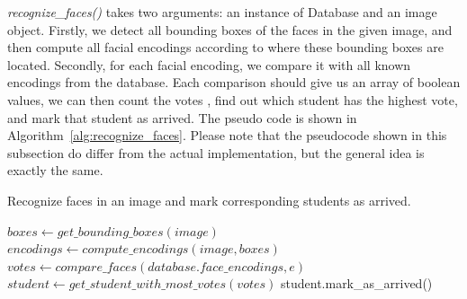 \emph{recognize\_faces()} takes two arguments: an instance of Database and an image object.
Firstly, we detect all bounding boxes of the faces in the given image, and then
compute all facial encodings according to where these bounding boxes are located.
Secondly, for each facial encoding, we compare it with all known encodings from the database.
Each comparison should give us an array of boolean values, we can then count the votes
, find out which student has the highest vote, and mark that student as arrived.
The pseudo code is shown in Algorithm~\ref{alg:recognize_faces}.
Please note that the pseudocode shown in this subsection do differ from the actual implementation,
but the general idea is exactly the same.
\vspace{0.2cm}

\begin{algorithm}
  \caption{Recognize faces in an image and mark corresponding students as arrived.}
  \label{alg:recognize_faces}
  \begin{algorithmic}
      \State $boxes \leftarrow get\_bounding\_boxes(image)$
      \State $encodings \leftarrow compute\_encodings(image, boxes)$
      \State 
        \State $votes \leftarrow compare\_faces(database.face\_encodings, e)$
        \State  $student \leftarrow get\_student\_with\_most\_votes(votes)$
        \State student.mark\_as\_arrived()
      \EndFor
    \EndProcedure
  \end{algorithmic}
\end{algorithm}
\vspace{0.5cm}
